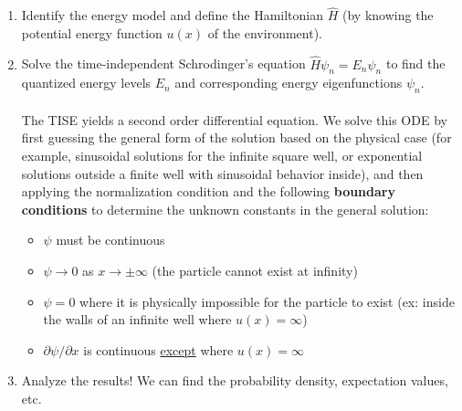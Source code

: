 \documentclass[12pt]{article}
\begin{document}
\begin{enumerate}
    \item Identify the energy model and define the Hamiltonian $\hat{H}$ (by knowing the potential energy function $u(x)$ of the environment).
    \item Solve the time-independent Schrodinger's equation $\hat{H}\psi_n = E_n \psi_n$ to find the quantized energy levels $E_n$ and corresponding energy eigenfunctions $\psi_n$.\\\\
    The TISE yields a second order differential equation. We solve this ODE by first guessing the general form of the solution based on the physical case (for example, sinusoidal solutions for the infinite square well, or exponential solutions outside a finite well with sinusoidal behavior inside), and then applying the normalization condition and the following \textbf{boundary conditions} to determine the unknown constants in the general solution:
    \begin{itemize}
        \item $\psi$ must be continuous
        \item $\psi \rightarrow 0$ as $x \rightarrow \pm \infty$ (the particle cannot exist at infinity)
        \item $\psi = 0$ where it is physically impossible for the particle to exist (ex: inside the walls of an infinite well where $u(x) = \infty$)
        \item $\partial \psi/\partial x$ is continuous \underline{except} where $u(x)=\infty$
    \end{itemize}
    \item Analyze the results! We can find the probability density, expectation values, etc.
\end{enumerate}
\newpage
\end{document}
